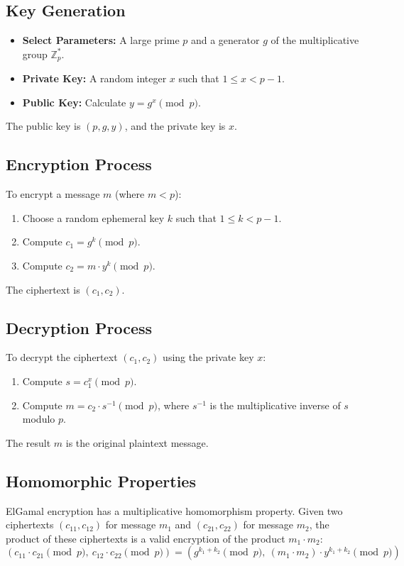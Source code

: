 \documentclass[12pt,a4paper]{report}
\begin{document}
\subsection{Key Generation}
\begin{itemize}
    \item \textbf{Select Parameters:} A large prime \( p \) and a generator \( g \) of the multiplicative group \( \mathbb{Z}_p^* \).
    \item \textbf{Private Key:} A random integer \( x \) such that \( 1 \leq x < p-1 \).
    \item \textbf{Public Key:} Calculate \( y = g^x \pmod p \).
\end{itemize}
The public key is \( (p, g, y) \), and the private key is \( x \).

\subsection{Encryption Process}
To encrypt a message \( m \) (where \( m < p \)):
\begin{enumerate}
    \item Choose a random ephemeral key \( k \) such that \( 1 \leq k < p-1 \).
    \item Compute \( c_1 = g^k \pmod p \).
    \item Compute \( c_2 = m \cdot y^k \pmod p \).
\end{enumerate}
The ciphertext is \( (c_1, c_2) \).

\subsection{Decryption Process}
To decrypt the ciphertext \( (c_1, c_2) \) using the private key \( x \):
\begin{enumerate}
    \item Compute \( s = c_1^x \pmod p \).
    \item Compute \( m = c_2 \cdot s^{-1} \pmod p \), where \( s^{-1} \) is the multiplicative inverse of \( s \) modulo \( p \).
\end{enumerate}
The result \( m \) is the original plaintext message.

\subsection{Homomorphic Properties}
ElGamal encryption has a multiplicative homomorphism property. Given two ciphertexts \( (c_{11}, c_{12}) \) for message \( m_1 \) and \( (c_{21}, c_{22}) \) for message \( m_2 \), the product of these ciphertexts is a valid encryption of the product \( m_1 \cdot m_2 \):
\[
(c_{11} \cdot c_{21} \pmod p, \ c_{12} \cdot c_{22} \pmod p) = \left( g^{k_1 + k_2} \pmod p, \ (m_1 \cdot m_2) \cdot y^{k_1 + k_2} \pmod p \right)
\]
\end{document}
